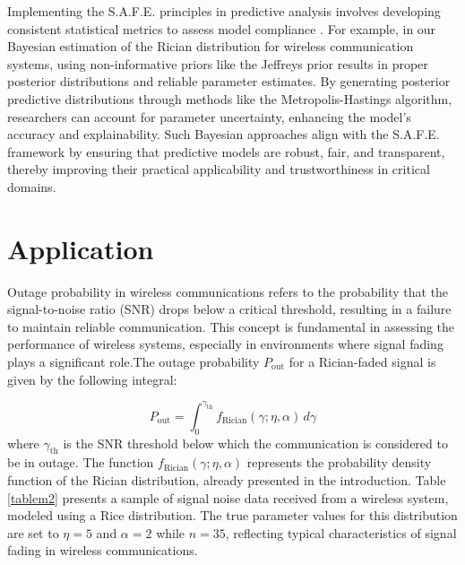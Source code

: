 \documentclass[12pt]{interact}
\theoremstyle{plain}%
\theoremstyle{definition}
\theoremstyle{remark}
\begin{document}
Implementing the S.A.F.E. principles in predictive analysis involves developing consistent statistical metrics to assess model compliance \cite{babaei2025rank}. For example, in our Bayesian estimation of the Rician distribution for wireless communication systems, using non-informative priors like the Jeffreys prior results in proper posterior distributions and reliable parameter estimates. By generating posterior predictive distributions through methods like the Metropolis-Hastings algorithm, researchers can account for parameter uncertainty, enhancing the model's accuracy and explainability. Such Bayesian approaches align with the S.A.F.E. framework by ensuring that predictive models are robust, fair, and transparent, thereby improving their practical applicability and trustworthiness in critical domains.


\newpage

\section{Application}

Outage probability in wireless communications refers to the probability that the signal-to-noise ratio (SNR) drops below a critical threshold, resulting in a failure to maintain reliable communication. This concept is fundamental in assessing the performance of wireless systems, especially in environments where signal fading plays a significant role.The outage probability \(P_{\text{out}}\) for a Rician-faded signal is given by the following integral:

\[
P_{\text{out}} = \int_0^{\gamma_{\text{th}}} f_{\text{Rician}}(\gamma; \eta, \alpha) \, d\gamma
\]
where \( \gamma_{\text{th}} \) is the SNR threshold below which the communication is considered to be in outage. The function \( f_{\text{Rician}}(\gamma; \eta, \alpha) \) represents the probability density function of the Rician distribution, already presented in the introduction. Table \ref{tablem2} presents a sample of signal noise data received from a wireless system, modeled using a Rice distribution. The true parameter values for this distribution are set to $\eta = 5$ and $\alpha = 2$ while \( n = 35 \), reflecting typical characteristics of signal fading in wireless communications.
\end{document}
